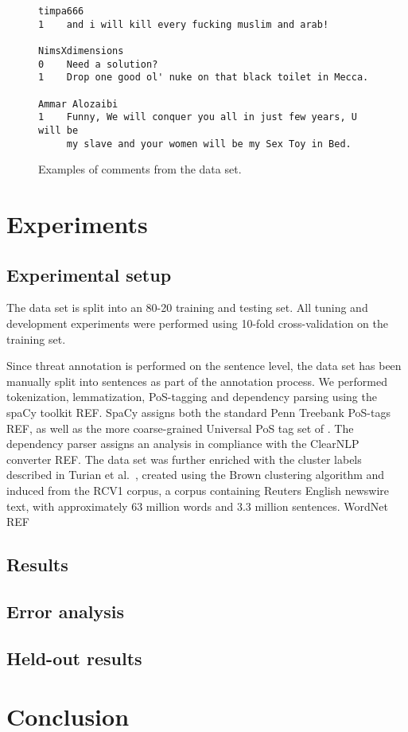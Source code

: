 \documentclass[11pt,letterpaper]{article}
\begin{document}
\begin{figure*}
\begin{verbatim}
timpa666
1    and i will kill every fucking muslim and arab!

NimsXdimensions
0    Need a solution?
1    Drop one good ol' nuke on that black toilet in Mecca.

Ammar Alozaibi
1    Funny, We will conquer you all in just few years, U will be
     my slave and your women will be my Sex Toy in Bed.

\end{verbatim}
\caption{Examples of comments from the data set.}
\label{fig:comments}
\end{figure*}

\section{Experiments}
\label{sec:exp}

\subsection{Experimental setup}
The data set is split into an 80-20 training and testing set. All
tuning and development experiments were performed using 10-fold
cross-validation on the training set.

Since threat annotation is performed on the sentence level, the data
set has been manually split into sentences as part of the annotation
process.  We performed tokenization, lemmatization, PoS-tagging and
dependency parsing using the spaCy toolkit REF.  SpaCy assigns both
the standard Penn Treebank PoS-tags REF, as well as the more
coarse-grained Universal PoS tag set of . The
dependency parser assigns an analysis in compliance with the ClearNLP
converter REF. The data set was further enriched with the cluster
labels described in Turian et al.~, created
using the Brown clustering algorithm \cite{Bro:deS:Mer:92} and induced
from the RCV1 corpus, a corpus containing Reuters English newswire
text, with approximately 63 million words and 3.3 million sentences.
WordNet REF




\subsection{Results}

\subsection{Error analysis}

\subsection{Held-out results}

\section{Conclusion}
\label{sec:disc}



\end{document}
